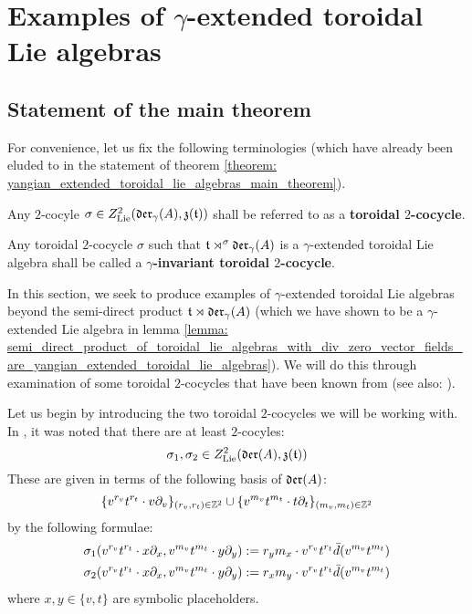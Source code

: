 \section{Examples of \texorpdfstring{$\gamma$}{}-extended toroidal Lie algebras}
    \subsection{Statement of the main theorem}
        For convenience, let us fix the following terminologies (which have already been eluded to in the statement of theorem \ref{theorem: yangian_extended_toroidal_lie_algebras_main_theorem}).
        \begin{definition} \label{def: yangian_toroidal_cocycles}
            Any $2$-cocyle $\sigma \in Z^2_{\mathrm{Lie}}(\mathfrak{der}_{\gamma}(A), \mathfrak{z}(\mathfrak{t}))$ shall be referred to as a \textbf{toroidal $2$-cocycle}.
            
            Any toroidal $2$-cocycle $\sigma$ such that $\mathfrak{t} \rtimes^{\sigma} \mathfrak{der}_{\gamma}(A)$ is a $\gamma$-extended toroidal Lie algebra shall be called a \textbf{$\gamma$-invariant toroidal $2$-cocycle}.
        \end{definition}
        
        In this section, we seek to produce examples of $\gamma$-extended toroidal Lie algebras beyond the semi-direct product $\mathfrak{t} \rtimes \mathfrak{der}_{\gamma}(A)$ (which we have shown to be a $\gamma$-extended Lie algebra in lemma \ref{lemma: semi_direct_product_of_toroidal_lie_algebras_with_div_zero_vector_fields_are_yangian_extended_toroidal_lie_algebras}). We will do this through examination of some toroidal $2$-cocycles that have been known from \cite{billig_energy_momentum_tensor} (see also: \cite{billig_a_module_category_over_toroidal_EALAs}).

        Let us begin by introducing the two toroidal $2$-cocycles we will be working with. In \cite[p. 5, below Equation 1.3]{billig_energy_momentum_tensor}, it was noted that there are at least $2$-cocyles:
            $$\sigma_1, \sigma_2 \in Z^2_{\mathrm{Lie}}( \mathfrak{der}(A), \mathfrak{z}(\mathfrak{t}) )$$
        These are given in terms of the following basis of $\mathfrak{der}(A)$:
            $$\{ v^{r_v} t^{r_t} \cdot v \partial_v \}_{(r_v, r_t) \in \mathbb{Z}^2} \cup \{ v^{m_v} t^{m_t} \cdot t \partial_t \}_{(m_v, m_t) \in \mathbb{Z}^2}$$
        by the following formulae:
            \begin{equation} \label{equation: billig_toroidal_cocycles}
                \begin{aligned}
                    & \sigma_1( v^{r_v} t^{r_t} \cdot x \partial_x, v^{m_v} t^{m_t} \cdot y \partial_y ) := r_y m_x \cdot v^{r_v} t^{r_t} \bar{d}( v^{m_v} t^{m_t} )
                    \\
                    & \sigma_2( v^{r_v} t^{r_t} \cdot x \partial_x, v^{m_v} t^{m_t} \cdot y \partial_y ) := r_x m_y \cdot v^{r_v} t^{r_t} \bar{d}( v^{m_v} t^{m_t} )
                \end{aligned}
            \end{equation}
        where $x, y \in \{v, t\}$ are symbolic placeholders.
        
